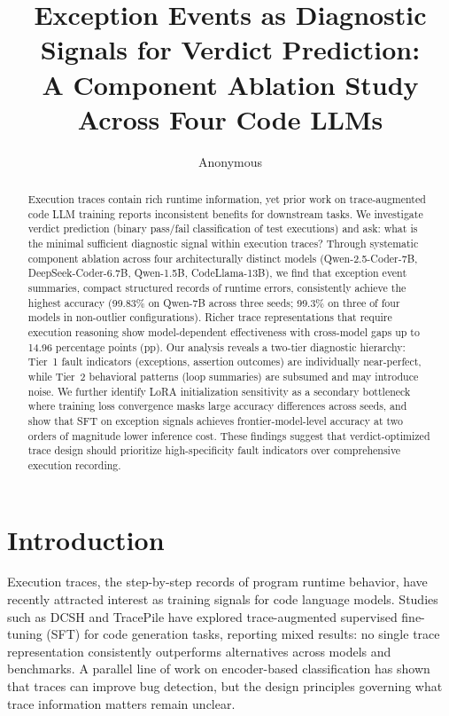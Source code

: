 \documentclass[11pt]{article}
\title{Exception Events as Diagnostic Signals for Verdict Prediction:\\A Component Ablation Study Across Four Code LLMs}
\author{Anonymous}
\date{}
\begin{document}
\maketitle

\begin{abstract}
Execution traces contain rich runtime information, yet prior work on trace-augmented code LLM training reports inconsistent benefits for downstream tasks. We investigate verdict prediction (binary pass/fail classification of test executions) and ask: what is the minimal sufficient diagnostic signal within execution traces? Through systematic component ablation across four architecturally distinct models (Qwen-2.5-Coder-7B, DeepSeek-Coder-6.7B, Qwen-1.5B, CodeLlama-13B), we find that exception event summaries, compact structured records of runtime errors, consistently achieve the highest accuracy (99.83\% on Qwen-7B across three seeds; 99.3\% on three of four models in non-outlier configurations). Richer trace representations that require execution reasoning show model-dependent effectiveness with cross-model gaps up to 14.96 percentage points (pp). Our analysis reveals a two-tier diagnostic hierarchy: Tier~1 fault indicators (exceptions, assertion outcomes) are individually near-perfect, while Tier~2 behavioral patterns (loop summaries) are subsumed and may introduce noise. We further identify LoRA initialization sensitivity as a secondary bottleneck where training loss convergence masks large accuracy differences across seeds, and show that SFT on exception signals achieves frontier-model-level accuracy at two orders of magnitude lower inference cost. These findings suggest that verdict-optimized trace design should prioritize high-specificity fault indicators over comprehensive execution recording.
\end{abstract}

\section{Introduction}
\label{sec:intro}

Execution traces, the step-by-step records of program runtime behavior, have recently attracted interest as training signals for code language models. Studies such as DCSH \citep{ni2024dcsh} and TracePile \citep{ding2025tracepile} have explored trace-augmented supervised fine-tuning (SFT) for code generation tasks, reporting mixed results: no single trace representation consistently outperforms alternatives across models and benchmarks. A parallel line of work on encoder-based classification \citep{traced2024} has shown that traces can improve bug detection, but the design principles governing what trace information matters remain unclear.
\end{document}
